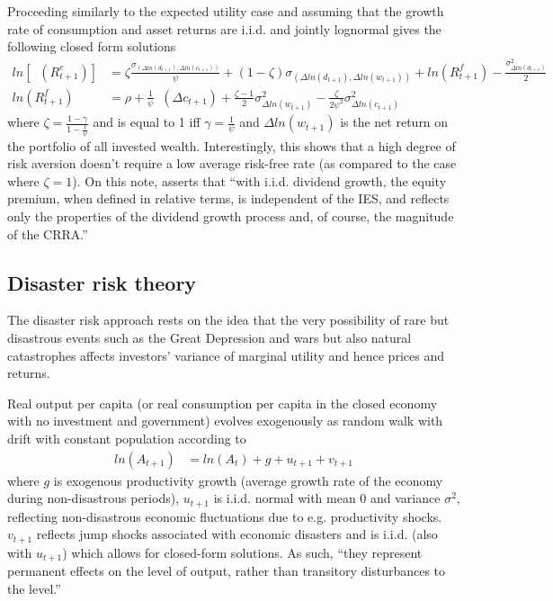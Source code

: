 Proceeding similarly to the expected utility case and assuming that the growth rate of consumption and asset returns are i.i.d. and jointly lognormal gives the following closed form solutions
\begin{align*}
    ln[\mathop{\mathbb{E}_{t}} (R_{t+1}^{e})] &= \zeta \frac{\sigma_{(\Delta ln(d_{t+1}), \Delta ln(c_{t+1}))}}{\psi} + (1-\zeta) \sigma_{(\Delta ln(d_{t+1}), \Delta ln(w_{t+1}))} + ln(R_{t+1}^{f}) - \frac{\sigma_{\Delta ln(d_{t+1})}^{2}}{2}\\
    ln(R_{t+1}^{f}) &= \rho + \frac{1}{\psi} \mathop{\mathbb{E}_{t}}(\Delta c_{t+1}) + \frac{\zeta -1}{2} \sigma_{\Delta ln(w_{t+1})}^{2} - \frac{\zeta}{2\psi^{2}} \sigma_{\Delta ln(c_{t+1})}^{2}
\end{align*}
where $\zeta = \frac{1-\gamma}{1-\frac{1}{\psi}}$ and is equal to 1 iff $\gamma = \frac{1}{\psi}$ and $\Delta ln(w_{t+1})$ is the net return on the portfolio of all invested wealth. Interestingly, this shows that a high degree of risk aversion doesn't require a low average risk-free rate (as compared to the case where $\zeta=1$).
On this note, \citet{Weil1989} asserts that ``with i.i.d. dividend growth, the equity premium, when defined in relative terms, is independent of the IES, and reflects only the properties of the dividend growth process and, of course, the magnitude of the CRRA.''

\subsection{Disaster risk theory} \label{disaster risk theory}
The disaster risk approach rests on the idea that the very possibility of rare but disastrous events such as the Great Depression and wars but also natural catastrophes affects investors' variance of marginal utility and hence prices and returns.

Real output per capita (or real consumption per capita in the closed economy with no investment and government) evolves exogenously as random walk with drift with constant population according to
\begin{align*}
    ln(A_{t+1}) &= ln(A_{t}) + g + u_{t+1} + v_{t+1}
\end{align*}
where $g$ is exogenous productivity growth (average growth rate of the economy during non-disastrous periods), $u_{t+1}$ is i.i.d. normal with mean 0 and variance $\sigma^{2}$, reflecting non-disastrous economic fluctuations due to e.g. productivity shocks. $v_{t+1}$ reflects jump shocks associated with economic disasters and is i.i.d. (also with $u_{t+1}$) which allows for closed-form solutions. As such, ``they represent permanent effects on the level of output, rather than transitory disturbances to the level.'' \cite{Barro2008}

